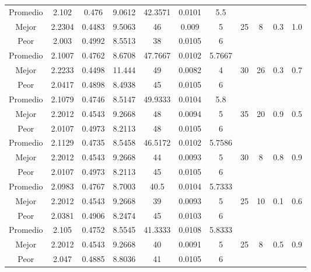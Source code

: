 \begin{table}[h!]
\begin{center}
\begin{tabular}{|c|c|c|c|c|c|c|c|c|c|c|}
        \hline
        \hline
            Promedio  & 2.102 & 0.476 & 9.0612 & 42.3571 & 0.0101 & 5.5 &  &  &  & \\
            \cline{1-7}
            Mejor & 2.2304 & 0.4483  & 9.5063 & 46 & 0.009 & 5 & 25 & 8 & 0.3 & 1.0\\
            \cline{1-7}
            Peor & 2.003 & 0.4992  & 8.5513 & 38 & 0.0105 & 6 &  &  &  & \\
        \hline
        \hline
            Promedio  & 2.1007 & 0.4762 & 8.6708 & 47.7667 & 0.0102 & 5.7667 &  &  &  & \\
            \cline{1-7}
            Mejor & 2.2233 & 0.4498  & 11.444 & 49 & 0.0082 & 4 & 30 & 26 & 0.3 & 0.7\\
            \cline{1-7}
            Peor & 2.0417 & 0.4898  & 8.4938 & 45 & 0.0105 & 6 &  &  &  & \\
        \hline
        \hline
            Promedio  & 2.1079 & 0.4746 & 8.5147 & 49.9333 & 0.0104 & 5.8 &  &  &  & \\
            \cline{1-7}
            Mejor & 2.2012 & 0.4543  & 9.2668 & 48 & 0.0094 & 5 & 35 & 20 & 0.9 & 0.5\\
            \cline{1-7}
            Peor & 2.0107 & 0.4973  & 8.2113 & 48 & 0.0105 & 6 &  &  &  & \\
        \hline
        \hline
            Promedio  & 2.1129 & 0.4735 & 8.5458 & 46.5172 & 0.0102 & 5.7586 &  &  &  & \\
            \cline{1-7}
            Mejor & 2.2012 & 0.4543  & 9.2668 & 44 & 0.0093 & 5 & 30 & 8 & 0.8 & 0.9\\
            \cline{1-7}
            Peor & 2.0107 & 0.4973  & 8.2113 & 45 & 0.0105 & 6 &  &  &  & \\
        \hline
        \hline
            Promedio  & 2.0983 & 0.4767 & 8.7003 & 40.5 & 0.0104 & 5.7333 &  &  &  & \\
            \cline{1-7}
            Mejor & 2.2012 & 0.4543  & 9.2668 & 39 & 0.0093 & 5 & 25 & 10 & 0.1 & 0.6\\
            \cline{1-7}
            Peor & 2.0381 & 0.4906  & 8.2474 & 45 & 0.0103 & 6 &  &  &  & \\
        \hline
        \hline
            Promedio  & 2.105 & 0.4752 & 8.5545 & 41.3333 & 0.0108 & 5.8333 &  &  &  & \\
            \cline{1-7}
            Mejor & 2.2012 & 0.4543  & 9.2668 & 40 & 0.0091 & 5 & 25 & 8 & 0.5 & 0.9\\
            \cline{1-7}
            Peor & 2.047 & 0.4885  & 8.8036 & 41 & 0.0105 & 6 &  &  &  & \\

\end{tabular}
\end{center}
\end{table}
